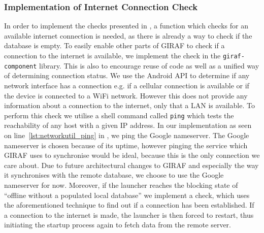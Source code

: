 \subsubsection{Implementation of Internet Connection Check}
In order to implement the checks presented in , a function which checks for an available internet connection is needed, as there is already a way to check if the database is empty.
To easily enable other parts of GIRAF to check if a connection to the internet is available, we implement the check in the \texttt{giraf-component} library.
This is also to encourage reuse of code as well as a unified way of determining connection status.
We use the Android API to determine if any network interface has a connection e.g. if a cellular connection is available or if the device is connected to a WiFi network.
However this does not provide any information about a connection to the internet, only that a LAN is available.
To perform this check we utilise a shell command called \texttt{ping} which tests the reachability of any host with a given IP address.
In our implementation as seen on line~\ref{lst:networkutil_ping} in , we ping the Google nameserver.
The Google nameserver is chosen because of its uptime, however pinging the service which GIRAF uses to synchronise would be ideal, because this is the only connection we care about.
Due to future architectural changes to GIRAF and especially the way it synchronises with the remote database, we choose to use the Google nameserver for now.
Moreover, if the launcher reaches the blocking state of \enquote{offline without a populated local database} we implement a check, which uses the aforementioned technique to find out if a connection has been established.
If a connection to the internet is made, the launcher is then forced to restart, thus initiating the startup process again to fetch data from the remote server.

